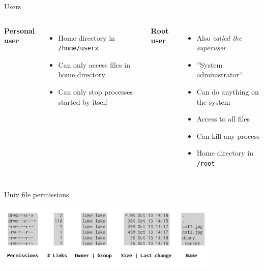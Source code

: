     \begin{frame}[t,fragile]{Users}
        \begin{columns}[T]
            \textbf{Personal user}
            \begin{itemize}
                \item{Home directory in \texttt{/home/userx}}
                \item{Can only access files in home directory}
                \item{Can only stop processes started by itself}
            \end{itemize}
            \textbf{Root user}
            \begin{itemize}
                \item{Also \emph{called the superuser}}
                \item{''System administrator``}
                \item{Can do anything on the system}
                \item{Access to all files}
                \item{Can kill any process}
                \item{Home directory in \texttt{/root}}
            \end{itemize}
        \end{columns}
    \end{frame}

    \begin{frame}[t,fragile]{Unix file permissions}
        \vspace{0.7cm}
        \begin{center}
            \includegraphics[width=0.8\textwidth]{img/permissions_overview.png}
        \end{center}
    \end{frame}

